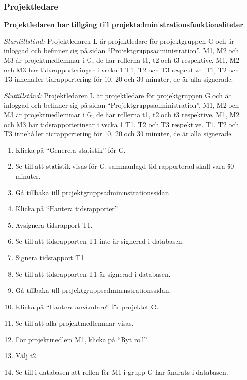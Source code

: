 \documentclass[a4paper]{article}
\begin{document}
\subsubsection{Projektledare}
\begin{ST}
\item \textbf{Projektledaren har tillgång till projektadministrationsfunktionaliteter}

\emph{Starttillstånd:} Projektledaren L är projektledare för projektgruppen G och är inloggad och befinner sig på sidan ``Projektgruppsadministration''. M1, M2 och M3 är projektmedlemmar i G, de har rollerna t1, t2 och t3 respektive. M1, M2 och M3 har tidsrapporteringar i vecka 1 T1, T2 och T3 respektive. T1, T2 och T3 innehåller tidrapportering för 10, 20 och 30 minuter, de är alla signerade.

\emph{Sluttillstånd:} Projektledaren L är projektledare för projektgruppen G och är inloggad och befinner sig på sidan ``Projektgruppsadministration''. M1, M2 och M3 är projektmedlemmar i G, de har rollerna t1, t2 och t3 respektive. M1, M2 och M3 har tidsrapporteringar i vecka 1 T1, T2 och T3 respektive. T1, T2 och T3 innehåller tidrapportering för 10, 20 och 30 minuter, de är alla signerade.

\begin{enumerate}
\item Klicka på ``Generera statistik'' för G.
\item Se till att statistik visas för G, sammanlagd tid rapporterad skall vara 60 minuter.
\item Gå tillbaka till projektgruppsadmininstrationssidan.
\item Klicka på ``Hantera tidsrapporter''.
\item Avsignera tidsrapport T1.
\item Se till att tidsrapporten T1 inte är signerad i databasen.
\item Signera tidsrapport T1.
\item Se till att tidsrapporten T1 är signerad i databasen.
\item Gå tillbaka till projektgruppsadmininstrationssidan.
\item Klicka på ``Hantera användare'' för projektet G.
\item Se till att alla projektmedlemmar visas.
\item För projektmedlem M1, klicka på ``Byt roll''.
\item Välj t2.
\item Se till i databasen att rollen för M1 i grupp G har ändrats i databasen.
\end{enumerate}
\end{ST}
\end{document}
